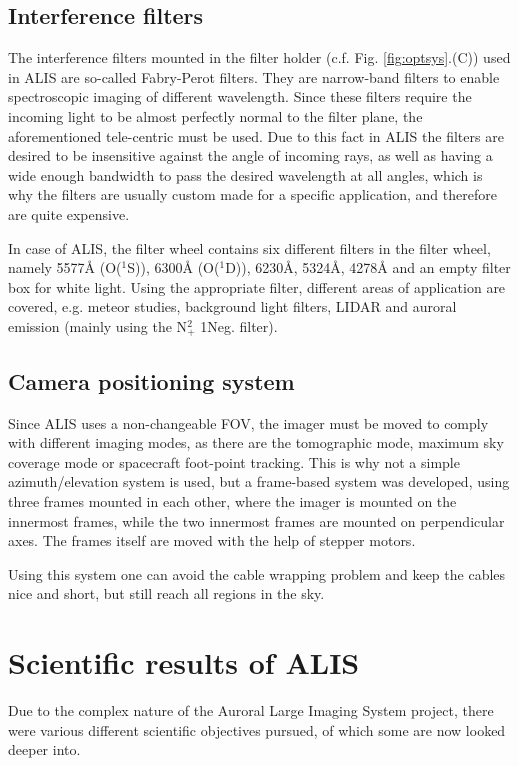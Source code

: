 \subsection{Interference filters}
\label{interference}
The interference filters mounted in the filter holder (c.f. Fig. \ref{fig:optsys}.(C)) used in ALIS are so-called Fabry-Perot filters. They are narrow-band filters to enable spectroscopic imaging of different wavelength. Since these filters require the incoming light to be almost perfectly normal to the filter plane, the aforementioned tele-centric must be used.
Due to this fact in ALIS the filters are desired to be insensitive against the angle of incoming rays, as well as having a wide enough bandwidth to pass the desired wavelength at all angles, which is why the filters are usually custom made for a specific application, and therefore are quite expensive. \par
In case of ALIS, the filter wheel contains six different filters in the filter wheel, namely 5577Å (O($^1$S)), 6300Å (O($^1$D)), 6230Å, 5324Å, 4278Å and an empty filter box for white light. Using the appropriate filter, different areas of application are covered, e.g. meteor studies, background light filters, LIDAR and auroral emission (mainly using the N$^2_+$ 1Neg. filter)\citep{brandstrom2003auroral}.

\subsection{Camera positioning system}
Since ALIS uses a non-changeable FOV, the imager must be moved to comply with different imaging modes, as there are the tomographic mode, maximum sky coverage mode or spacecraft foot-point tracking. This is why not a simple azimuth/elevation system is used, but a frame-based system was developed, using three frames mounted in each other, where the imager is mounted on the innermost frames, while the two innermost frames are mounted on perpendicular axes. The frames itself are moved with the help of stepper motors.

Using this system one can avoid the cable wrapping problem and keep the cables nice and short, but still reach all regions in the sky.



\section{Scientific results of ALIS}
Due to the complex nature of the Auroral Large Imaging System project, there were various different scientific objectives pursued, of which some are now looked deeper into.

